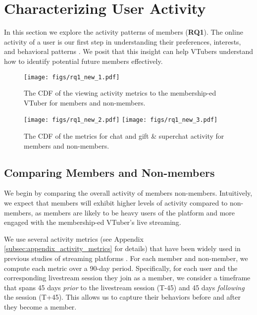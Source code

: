 

\section{Characterizing User Activity}
\label{sec:RQ1}

In this section we explore the activity patterns of members (\textbf{RQ1}).
The online activity of a user is our first step in understanding their preferences, interests, and behavioral patterns \cite{Gyarmati2010, Zhu2023}. We posit that this insight can help VTubers understand how to identify potential future members effectively.

\begin{figure}[]
    \centering
    \texttt{[image: figs/rq1\_new\_1.pdf]}
    \vspace{-5ex}
    \caption{The CDF of the viewing activity metrics to the membership-ed VTuber for members and non-members.}
    \label{fig:rq1_1}
\end{figure}

\begin{figure*}
    \centering
    \texttt{[image: figs/rq1\_new\_2.pdf]}
    \texttt{[image: figs/rq1\_new\_3.pdf]}
    \vspace{-2ex}
    \caption{The CDF of the metrics for chat and gift \& superchat activity for members and non-members.}
    \label{fig:rq1_2}
\end{figure*}

\subsection{Comparing Members and Non-members}
\label{subsec:rq1_compare}

We begin by comparing the overall activity of members \vs non-members. Intuitively, we expect that members will exhibit higher levels of activity compared to non-members, as members are likely to be heavy users of the platform and more engaged with the membership-ed VTuber's live streaming.

We use several activity metrics (see Appendix \ref{subsec:appendix_activity_metrics} for details) that have been widely used in previous studies of streaming platforms \cite{10.1145/3311350.3347149}.
For each member and non-member, we compute each metric over a 90-day period. 
Specifically, for each user and the corresponding livestream session they join as a member, we consider a timeframe that spans 45 days \emph{prior} to the livestream session (T-45) and 45 days \emph{following} the session (T+45). This allows us to capture their behaviors before and after they become a member.

